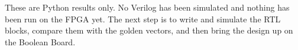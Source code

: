 \documentclass[10pt,twocolumn,letterpaper]{article}
\newcommand{\fillme}[1]{\textcolor{red}{[#1]}}
\begin{document}
These are Python results only. No Verilog has been simulated and nothing has
been run on the FPGA yet. The next step is to write and simulate the RTL
blocks, compare them with the golden vectors, and then bring the design up on
the Boolean Board.





{\small


}
\end{document}
